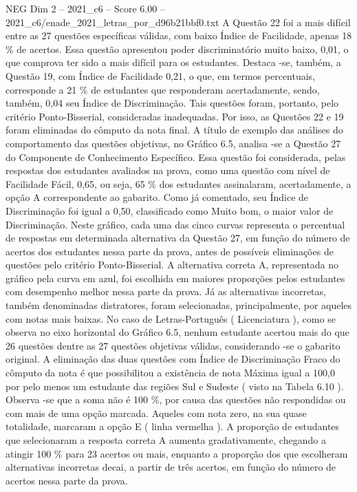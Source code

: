 \begin{textsample}{NEG Dim 2 – 2021\_c6 – Score 6.00 – 2021\_c6/enade\_2021\_letras\_por\_d96b21bbf0.txt}
A Questão 22 foi a mais difícil entre as 27 questões específicas válidas, com baixo Índice de Facilidade, apenas 18 \% de acertos.
Essa questão apresentou poder discriminatório muito baixo, 0,01, o que comprova ter sido a mais difícil para os estudantes.
Destaca -se, também, a Questão 19, com Índice de Facilidade 0,21, o que, em termos percentuais, corresponde a 21 \% de estudantes que responderam acertadamente, sendo, também, 0,04 seu Índice de Discriminação.
Tais questões foram, portanto, pelo critério Ponto-Bisserial, consideradas inadequadas.
Por isso, as Questões 22 e 19 foram eliminadas do cômputo da nota final.
A título de exemplo das análises do comportamento das questões objetivas, no Gráfico 6.5, analisa -se a Questão 27 do Componente de Conhecimento Específico.
Essa questão foi considerada, pelas respostas dos estudantes avaliados na prova, como uma questão com nível de Facilidade Fácil, 0,65, ou seja, 65 \% dos estudantes assinalaram, acertadamente, a opção A correspondente ao gabarito.
Como já comentado, seu Índice de Discriminação foi igual a 0,50, classificado como Muito bom, o maior valor de Discriminação.
Neste gráfico, cada uma das cinco curvas representa o percentual de respostas em determinada alternativa da Questão 27, em função do número de acertos dos estudantes nessa parte da prova, antes de possíveis eliminações de questões pelo critério Ponto-Bisserial.
A alternativa correta A, representada no gráfico pela curva em azul, foi escolhida em maiores proporções pelos estudantes com desempenho melhor nessa parte da prova.
Já as alternativas incorretas, também denominadas distratores, foram selecionadas, principalmente, por aqueles com notas mais baixas.
No caso de Letras-Português ( Licenciatura ), como se observa no eixo horizontal do Gráfico 6.5, nenhum estudante acertou mais do que 26 questões dentre as 27 questões objetivas válidas, considerando -se o gabarito original.
A eliminação das duas questões com Índice de Discriminação Fraco do cômputo da nota é que possibilitou a existência de nota Máxima igual a 100,0 por pelo menos um estudante das regiões Sul e Sudeste ( visto na Tabela 6.10 ).
Observa -se que a soma não é 100 \%, por causa das questões não respondidas ou com mais de uma opção marcada.
Aqueles com nota zero, na sua quase totalidade, marcaram a opção E ( linha vermelha ).
A proporção de estudantes que selecionaram a resposta correta A aumenta gradativamente, chegando a atingir 100 \% para 23 acertos ou mais, enquanto a proporção dos que escolheram alternativas incorretas decai, a partir de três acertos, em função do número de acertos nessa parte da prova.

\end{textsample}
